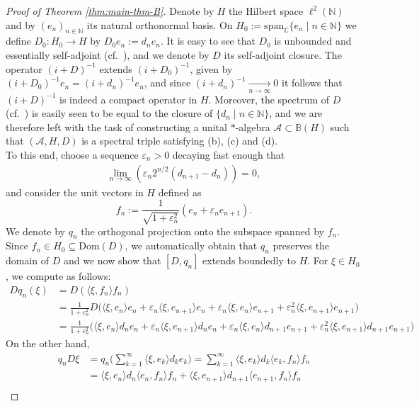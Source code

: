 \documentclass[12pt,a4paper,twoside,reqno]{amsart}
\theoremstyle{plain}
\theoremstyle{definition}
\theoremstyle{remark} %
\theoremstyle{plain}
\numberwithin{equation}{section}
\newcommand{\varps}{{\varepsilon}}
\newcommand{\inn}[1]{\langle #1 \rangle}
\newcommand{\A}{{\mathcal{A}}}
\newcommand{\BB}{{\mathbb{B}}}
\newcommand{\NN}{{\mathbb{N}}}
\begin{document}
\begin{proof}[Proof of Theorem \ref{thm:main-thm-B}]
Denote by $H$ the Hilbert space $\ell^2(\NN)$ and by $(e_n)_{n\in \NN}$ its natural orthonormal basis. On $H_0:=\text{span}_{\mathbb{C}}\{e_n\mid n\in \NN\}$ we define $D_0\colon H_0 \to H$ by $D_0e_n:= d_n e_n$. It is easy to see that $D_0$ is unbounded and essentially self-adjoint (cf.~\cite[Proposition 3.8]{Schm:Unbd}), and we denote by $D$ its self-adjoint closure. 
The operator $(i+D)^{-1}$ extends $(i+D_0)^{-1}$,  given by  $(i+D_0)^{-1}e_n=(i+d_n)^{-1}e_n$, and since $(i+d_n)^{-1}\underset{n\to \infty}{\longrightarrow} 0$ it follows that $(i+D)^{-1}$ is indeed a compact operator in $H$. Moreover, the spectrum of $D$ (cf.~\cite[Section 2.2]{Schm:Unbd}) is easily seen to be equal to the closure of $\{d_n\mid n\in \NN\}$, and we are therefore left with the task of constructing a unital $*$-algebra $\A\subset \BB(H)$ such that $(\A, H, D)$ is a spectral triple satisfying (b), (c) and (d).\\
To this end, choose a sequence $\varps_n>0$ decaying fast enough that 
 \begin{align}\label{eq:varps-sequence}
 \lim_{n\to \infty} (\varps_n2^{n/2}(d_{n+1}-d_n))=0,
 \end{align}
  and consider the unit vectors in $H$ defined as
\[
f_n:=\frac{1}{\sqrt{1+ \varps_n^2}}(e_n + \varps_ne_{n+1}).
\]
We denote by $q_n$ the orthogonal projection onto the subspace spanned by $f_n$. Since $f_n\in H_0\subseteq \text{Dom}(D)$, we automatically obtain that  $q_n$ preserves the domain of $D$ and we now show that $[D,q_n]$ extends boundedly to $H$. For $\xi \in H_0$, we compute as follows:
\begin{align*}
Dq_n (\xi) &= D(\inn{\xi, f_n }f_n)\\
&= \frac{1}{1+ \varps_n^2}  D\Big(\inn{\xi, e_n}e_n +\varps_n\inn{\xi, e_{n+1}}e_n +\varps_n\inn{\xi, e_n}e_{n+1} +\varps_n^{2} \inn{\xi, e_{n+1}}e_{n+1}\Big)\\
&= \frac{1}{1+ \varps_n^2}\Big(\inn{\xi, e_n}d_ne_n +\varps_n\inn{\xi, e_{n+1}}d_ne_n +\varps_n\inn{\xi, e_n}d_{n+1}e_{n+1} +\varps_n^{2} \inn{\xi, e_{n+1}}d_{n+1}e_{n+1}\Big)
\end{align*}
On the other hand, 
\begin{align*}
q_n D\xi &= q_n\Big( \sum_{k=1}^\infty \inn{\xi, e_k} d_ke_k\Big) =  \sum_{k=1}^\infty \inn{\xi, e_k} d_k \inn{e_k, f_n}f_n\\
&= \inn{\xi,e_n}d_n\inn{e_n, f_n}f_n +\inn{\xi, e_{n+1}}d_{n+1} \inn{e_{n+1}, f_n}f_n\\

\end{align*}
\end{proof}
\end{document}
